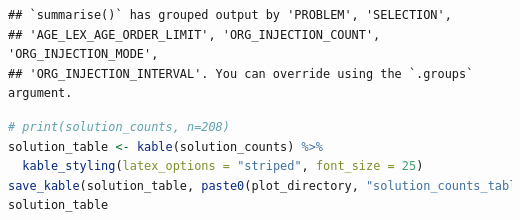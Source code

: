\documentclass[
]{book}
\begin{document}
\begin{lstlisting}
## `summarise()` has grouped output by 'PROBLEM', 'SELECTION',
## 'AGE_LEX_AGE_ORDER_LIMIT', 'ORG_INJECTION_COUNT', 'ORG_INJECTION_MODE',
## 'ORG_INJECTION_INTERVAL'. You can override using the `.groups` argument.
\end{lstlisting}

\begin{lstlisting}[language=R]
# print(solution_counts, n=208)
solution_table <- kable(solution_counts) %>%
  kable_styling(latex_options = "striped", font_size = 25)
save_kable(solution_table, paste0(plot_directory, "solution_counts_table.pdf"))
solution_table
\end{lstlisting}

\begin{table}
\centering\begingroup\fontsize{25}{27}\selectfont


\end{table}
\end{document}
